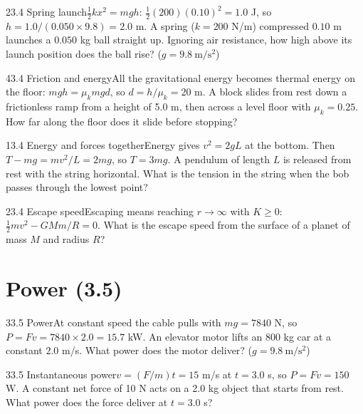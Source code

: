 \documentclass[11pt]{article}
\begin{document}
\begin{q}{2}{3.4 Spring launch}{$\tfrac12 kx^2 = mgh$: $\tfrac12(200)(0.10)^2 = 1.0$ J, so $h = 1.0/(0.050 \times 9.8) = 2.0$ m.}
A spring ($k = 200$ N/m) compressed $0.10$ m launches a $0.050$ kg ball straight up. Ignoring air resistance, how high above its launch position does the ball rise? ($g = 9.8\ \mathrm{m/s^2}$)
\end{q}
\begin{q}{4}{3.4 Friction and energy}{All the gravitational energy becomes thermal energy on the floor: $mgh = \mu_k mg d$, so $d = h/\mu_k = 20$ m.}
A block slides from rest down a frictionless ramp from a height of 5.0 m, then across a level floor with $\mu_k = 0.25$. How far along the floor does it slide before stopping?
\end{q}
\begin{q}{1}{3.4 Energy and forces together}{Energy gives $v^2 = 2gL$ at the bottom. Then $T - mg = mv^2/L = 2mg$, so $T = 3mg$.}
A pendulum of length $L$ is released from rest with the string horizontal. What is the tension in the string when the bob passes through the lowest point?
\end{q}
\begin{q}{2}{3.4 Escape speed}{Escaping means reaching $r \to \infty$ with $K \ge 0$: $\tfrac12 mv^2 - GMm/R = 0$.}
What is the escape speed from the surface of a planet of mass $M$ and radius $R$?
\end{q}

\section{Power (3.5)}

\begin{q}{3}{3.5 Power}{At constant speed the cable pulls with $mg = 7840$ N, so $P = Fv = 7840 \times 2.0 = 15.7$ kW.}
An elevator motor lifts an 800 kg car at a constant $2.0$ m/s. What power does the motor deliver? ($g = 9.8\ \mathrm{m/s^2}$)
\end{q}
\begin{q}{3}{3.5 Instantaneous power}{$v = (F/m)t = 15$ m/s at $t = 3.0$ s, so $P = Fv = 150$ W.}
A constant net force of 10 N acts on a 2.0 kg object that starts from rest. What power does the force deliver at $t = 3.0$ s?
\end{q}
\end{document}
